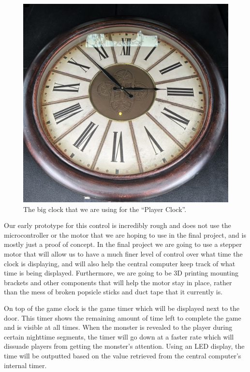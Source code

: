 \documentclass[conference]{IEEEtran}
\begin{document}
\begin{figure}[ht]
    \centering
    \includegraphics[width=0.85\columnwidth]{Images/big-clock.jpg}
    \caption{The big clock that we are using for the ``Player Clock''.}
\end{figure}

Our early prototype for this control is incredibly rough and does not use the microcontroller or the
motor that we are hoping to use in the final project, and is mostly just a proof of concept. In the
final project we are going to use a stepper motor that will allow us to have a much finer level of
control over what time the clock is displaying, and will also help the central computer keep track of
what time is being displayed. Furthermore, we are going to be 3D printing mounting brackets and other
components that will help the motor stay in place, rather than the mess of broken popsicle sticks and
duct tape that it currently is.

On top of the game clock is the game timer which will be displayed next to the door. This timer
shows the remaining amount of time left to complete the game and is visible at all times. When the
monster is revealed to the player during certain nighttime segments, the timer will go down at a
faster rate which will dissuade players from getting the monster's attention. Using an LED display,
the time will be outputted based on the value retrieved from the central computer's internal timer.



\end{document}
